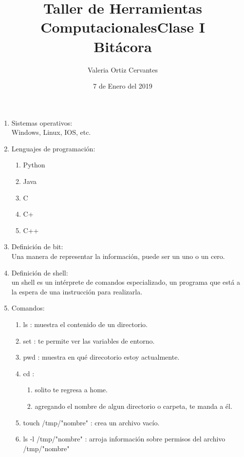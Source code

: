 \documentclass[letterpaper, 12pt, oneside]{article} %
\title{\Huge Taller de Herramientas Computacionales}
\author{Valeria Ortiz Cervantes}
\date{7 de Enero del 2019}
\begin{document}
	\maketitle
	\newpage
	\title{Clase I\\Bitácora\\}
	\begin{enumerate}
		\item Sistemas operativos:\\Windows, Linux, IOS, etc.
		\item Lenguajes de programación:
		\begin{enumerate}
			\item Python
			\item Java
			\item C
			\item C+
			\item C++
		\end{enumerate}
	\item Definición de bit:\\Una manera de representar la información, puede ser un uno o un cero. 
	\item Definición de shell:\\ un shell es un intérprete de comandos especializado, un programa que está a la espera de una instrucción para realizarla. 
		\item Comandos:
	\begin{enumerate}
		\item ls : muestra el contenido de un directorio.
		\item set : te permite ver las variables de entorno.
		\item pwd : muestra en qué direcotorio estoy actualmente.
		\item cd : \begin{enumerate}
			\item solito te regresa a home. 
			\item agregando el nombre de algun directorio o carpeta, te manda a él.                 
		\end{enumerate}  
		\item touch /tmp/"nombre" : crea un archivo vacío.
		\item ls -l /tmp/"nombre" : arroja información sobre permisos del archivo /tmp/"nombre"
	\end{enumerate}                         
	\end{enumerate}
\end{document}
